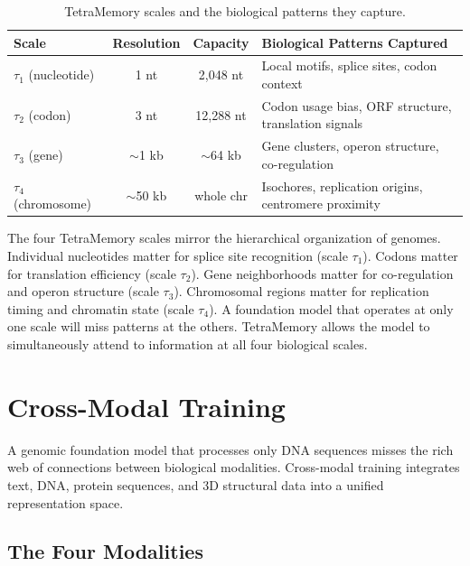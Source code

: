 \begin{table}[H]
\centering
\caption{TetraMemory scales and the biological patterns they capture.}
\label{tab:tetramemory-patterns}
\begin{tabularx}{\textwidth}{l c c Y}
\toprule
\textbf{Scale} & \textbf{Resolution} & \textbf{Capacity} & \textbf{Biological Patterns Captured} \\
\midrule
$\tau_1$ (nucleotide) & 1 nt & 2,048 nt & Local motifs, splice sites, codon context \\
$\tau_2$ (codon) & 3 nt & 12,288 nt & Codon usage bias, ORF structure, translation signals \\
$\tau_3$ (gene) & $\sim$1 kb & $\sim$64 kb & Gene clusters, operon structure, co-regulation \\
$\tau_4$ (chromosome) & $\sim$50 kb & whole chr & Isochores, replication origins, centromere proximity \\
\bottomrule
\end{tabularx}
\end{table}

\begin{bioinsight}
The four TetraMemory scales mirror the hierarchical organization of genomes. Individual nucleotides matter for splice site recognition (scale $\tau_1$). Codons matter for translation efficiency (scale $\tau_2$). Gene neighborhoods matter for co-regulation and operon structure (scale $\tau_3$). Chromosomal regions matter for replication timing and chromatin state (scale $\tau_4$). A foundation model that operates at only one scale will miss patterns at the others. TetraMemory allows the model to simultaneously attend to information at all four biological scales.
\end{bioinsight}

\section{Cross-Modal Training}
\label{sec:cross-modal}

A genomic foundation model that processes only DNA sequences misses the rich web of connections between biological modalities. Cross-modal training integrates text, DNA, protein sequences, and 3D structural data into a unified representation space.

\subsection{The Four Modalities}

